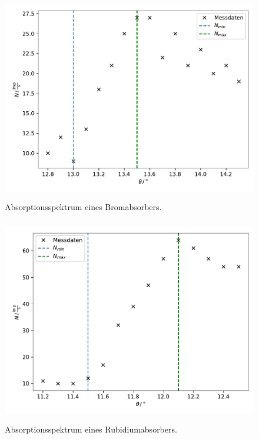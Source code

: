 \begin{figure}
    \centering
       \includegraphics[height=9cm]{daten/brom.pdf}
       \caption{Absorptionsspektrum eines Bromabsorbers.}
       \label{fig:brom}
\end{figure}

\begin{figure}
    \centering
       \includegraphics[height=9cm]{daten/rubidium.pdf}
       \caption{Absorptionsspektrum eines Rubidiumabsorbers.}
       \label{fig:rubidium}
\end{figure}

